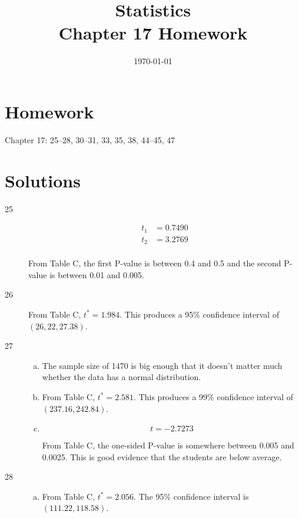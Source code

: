 \documentclass[letterpaper, landscape]{exam}
\title{Statistics \\ Chapter 17 Homework}
\date{\today}
\author{}
\begin{document}
  \maketitle

  \section{Homework}
  Chapter 17: 25--28, 30--31, 33, 35, 38, 44--45, 47

  \ifprintanswers{}
    \section{Solutions}
    \begin{description}

      \item[25] 
        \begin{align*}
          t_1 &= 0.7490 \\
          t_2 &= 3.2769 \\
        \end{align*}

        From Table C, the first P-value is between 0.4 and 0.5 and the second
        P-value is between 0.01 and 0.005.

      \item[26]
        From Table C, $t^* = 1.984$. This produces a 95\% confidence interval of
        $(26,22, 27.38)$.

      \item[27]
        \begin{enumerate}[(a)]
          \item The sample size of 1470 is big enough that it doesn't matter
            much whether the data has a normal distribution.

          \item From Table C, $t^* = 2.581$. This produces a 99\% confidence
            interval of $(237.16, 242.84)$.

          \item 
            \[
              t = -2.7273
            \]

            From Table C, the one-sided P-value is somewhere between 0.005 and
            0.0025. This is good evidence that the students are below average.

        \end{enumerate}

      \item[28]
        \begin{enumerate}[(a)]
          \item From Table C, $t^* = 2.056$.  The 95\% confidence interval is
            $(111.22, 118.58)$.


\end{enumerate}
\end{description}
\end{document}
